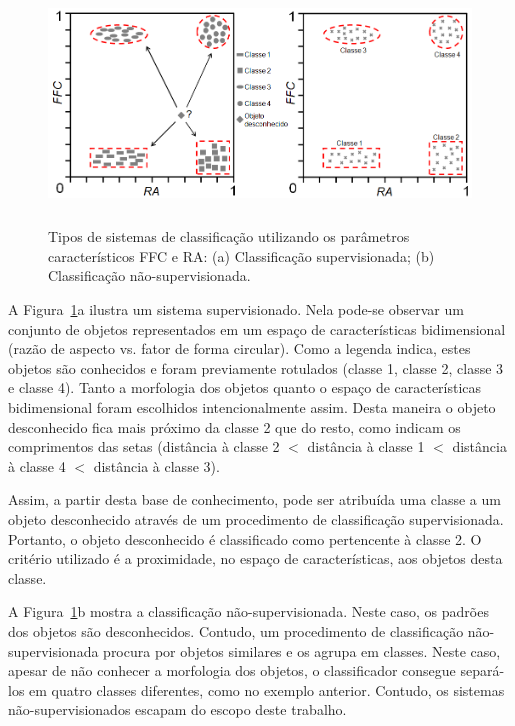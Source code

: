 \begin{figure} [h]
  \begin{center}
    \includegraphics[height=179pt,width=400pt]{images/fig_class-supnaosup}
    \caption{Tipos de sistemas de classificação utilizando os
      parâmetros característicos FFC e RA: (a) Classificação
      supervisionada; (b) Classificação
      não-supervisionada.}\label{fig:class-supnaosup}
  \end{center}
\end{figure}
 
A Figura~\ref{fig:class-supnaosup}a ilustra um sistema
supervisionado. Nela pode-se observar um conjunto de objetos
representados em um espaço de características bidimensional (razão de
aspecto vs. fator de forma circular). Como a legenda indica, estes
objetos são conhecidos e foram previamente rotulados (classe 1, classe
2, classe 3 e classe 4). Tanto a morfologia dos objetos quanto o
espaço de características bidimensional foram escolhidos
intencionalmente assim. Desta maneira o objeto desconhecido fica mais
próximo da classe 2 que do resto, como indicam os comprimentos das
setas (distância à classe 2 $<$ distância à classe 1 $<$ distância à
classe 4 $<$ distância à classe 3).
 
Assim, a partir desta base de conhecimento, pode ser atribuída uma
classe a um objeto desconhecido através de um procedimento de
classificação supervisionada. Portanto, o objeto desconhecido é
classificado como pertencente à classe 2. O critério utilizado é a
proximidade, no espaço de características, aos objetos desta classe.

A Figura~\ref{fig:class-supnaosup}b mostra a classificação
não-supervisionada. Neste caso, os padrões dos objetos são
desconhecidos. Contudo, um procedimento de classificação
não-supervisionada procura por objetos similares e os agrupa em
classes. Neste caso, apesar de não conhecer a morfologia dos objetos,
o classificador consegue separá-los em quatro classes diferentes, como
no exemplo anterior. Contudo, os sistemas não-supervisionados escapam
do escopo deste trabalho.

